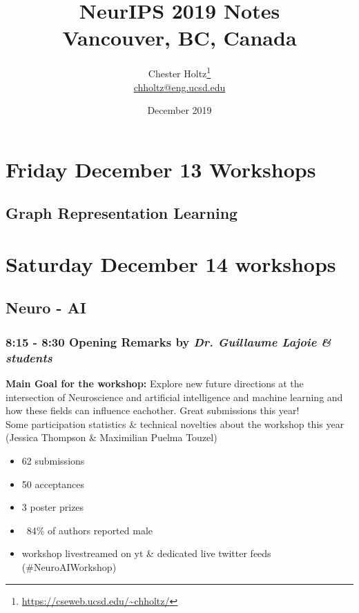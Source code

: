\documentclass[12pt]{article}
\title{NeurIPS 2019 Notes \\ \Large{Vancouver, BC, Canada}}
\author{Chester Holtz\footnote{\url{https://cseweb.ucsd.edu/\~chholtz/}} \\ \url{chholtz@eng.ucsd.edu}}
\date{December 2019}
\begin{document}
\maketitle


\section{Friday December 13 Workshops}

\subsection{Graph Representation Learning}

\section{Saturday December 14 workshops}

\subsection{Neuro - AI}

\subsubsection{8:15 - 8:30 Opening Remarks by \textit{Dr. Guillaume Lajoie \& students}}

\textbf{Main Goal for the workshop:} Explore new future directions at the intersection of Neuroscience and artificial intelligence and machine learning and how these fields can influence eachother. Great submissions this year! \\

Some participation statistics \& technical novelties about the workshop this year (Jessica Thompson \& Maximilian Puelma Touzel)
\begin{itemize}
\item 62 submissions
\item 50 acceptances
\item 3 poster prizes
\item ~84\% of authors reported male
\item workshop livestreamed on yt \& dedicated live twitter feeds (\#NeuroAIWorkshop)
\end{itemize}
\end{document}
